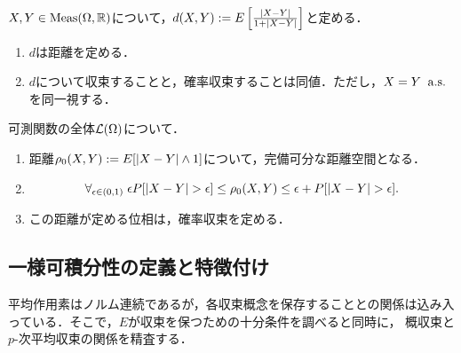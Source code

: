 \documentclass[uplatex,dvipdfmx]{jsreport}
\begin{document}
\begin{proposition}[確率収束を定める距離1]
    $X,Y\in\mathrm{Meas}(\Omega,\mathbb{R})$について，$d(X,Y):=E\left[\frac{\lvert X-Y\rvert}{1+\lvert X-Y\rvert}\right]$と定める．
    \begin{enumerate}
        \item $d$は距離を定める．
        \item $d$について収束することと，確率収束することは同値．ただし，$X=Y\;\;\mathrm{a.s.}$を同一視する．
    \end{enumerate}
\end{proposition}

\begin{proposition}[確率収束を定める距離2]
        可測関数の全体$\mathcal{L}(\Omega)$について．
        \begin{enumerate}
            \item 距離$\rho_0(X,Y):=E[\lvert X-Y\rvert\land 1]$について，完備可分な距離空間となる．
            \item \[\forall_{\epsilon\in(0,1)}\;\epsilon P[\lvert X-Y\rvert>\epsilon]\le\rho_0(X,Y)\le\epsilon+P[\lvert X-Y\rvert>\epsilon].\]
            \item この距離が定める位相は，確率収束を定める．
        \end{enumerate}
\end{proposition}

\subsection{一様可積分性の定義と特徴付け}

\begin{tcolorbox}[colframe=ForestGreen, colback=ForestGreen!10!white,breakable,colbacktitle=ForestGreen!40!white,coltitle=black,fonttitle=\bfseries\sffamily,
title=]
    平均作用素はノルム連続であるが，各収束概念を保存することとの関係は込み入っている．そこで，$E$が収束を保つための十分条件を調べると同時に，
    概収束と$p$-次平均収束の関係を精査する．
\end{tcolorbox}
\end{document}
